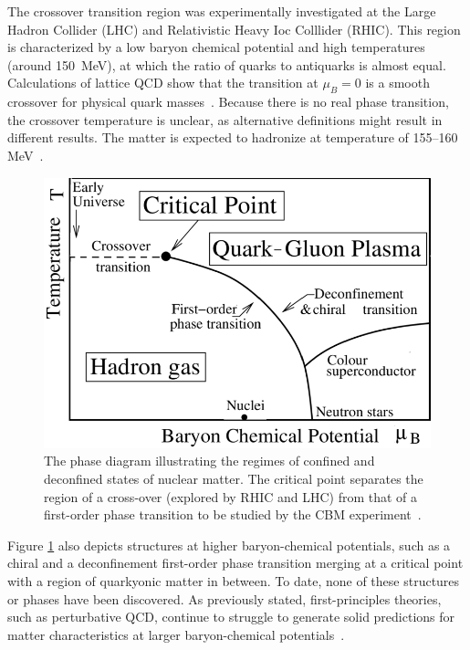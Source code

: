 The crossover transition region was experimentally investigated at the Large Hadron Collider (\gls{LHC}) and Relativistic Heavy Ioc Colllider (\gls{RHIC}). This region is characterized by a low baryon chemical potential and high temperatures (around 150~MeV), at which the ratio of quarks to antiquarks is almost equal. Calculations of lattice \gls{QCD} show that the transition at $\mu_{B} = 0$ is a smooth crossover for
physical quark masses~\cite{Aoki_2006}. Because there is no real phase transition, the crossover temperature is unclear, as alternative definitions might result in different results. The matter is expected to hadronize at temperature of 155--160 MeV~\cite{Bazavov_2012, Stachel_2014}.



\begin{figure}[!h]
\centering
 \includegraphics[width=0.65\columnwidth]{Chapter1/images/phase.png}
\caption{The phase diagram illustrating the regimes of confined and deconfined states of nuclear matter. The critical point separates the region of a cross-over (explored by RHIC and LHC) from that of a first-order phase transition to be studied by the CBM experiment~\cite{friese_diagram}.}
\label{fig_phase}
\end{figure}
\newpage
Figure \ref{fig_phase} also depicts structures at higher baryon-chemical potentials, such as a chiral and a deconfinement first-order phase transition merging at a critical point with a region of quarkyonic matter in between. To date, none of these structures or phases have been discovered. As previously stated, first-principles theories, such as perturbative QCD, continue to struggle to generate solid predictions for matter characteristics at larger baryon-chemical potentials~\cite{Sakai_2008, Fischer_01, Tawfik_01}. 



